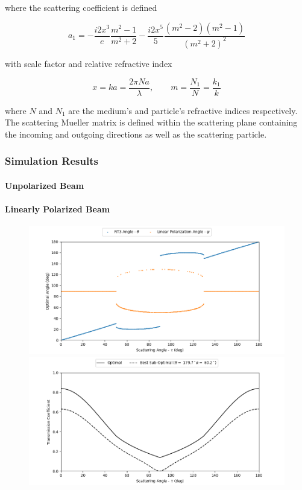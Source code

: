 where the scattering coefficient is defined

\begin{equation}
    a_1 = -\frac{i2x^3}{e} \frac{m^2 - 1}{m^2 + 2} - \frac{i2x^5}{5} \frac{(m^2 - 2)(m^2 - 1)}{(m^2 + 2)^2}
\end{equation}

with scale factor and relative refractive index

\begin{equation}
    x = ka = \frac{2 \pi N a}{\lambda},  \qquad m = \frac{N_1}{N} = \frac{k_1}{k}
\end{equation}

where $N$ and $N_1$ are the medium's and particle's refractive indices respectively. The scattering Mueller matrix is defined within the scattering plane containing the incoming and outgoing directions as well as the scattering particle.

\subsubsection{Simulation Results}

\paragraph{Unpolarized Beam}

\paragraph{Linearly Polarized Beam}

\begin{figure}
    \centering
    \includegraphics[width=0.49\linewidth]{figures/polctrl1_traj.png}
    \includegraphics[width=0.49\linewidth]{figures/polctrl1_trans.png}
    \caption{}
    \label{fig:polctrl1}
\end{figure}

